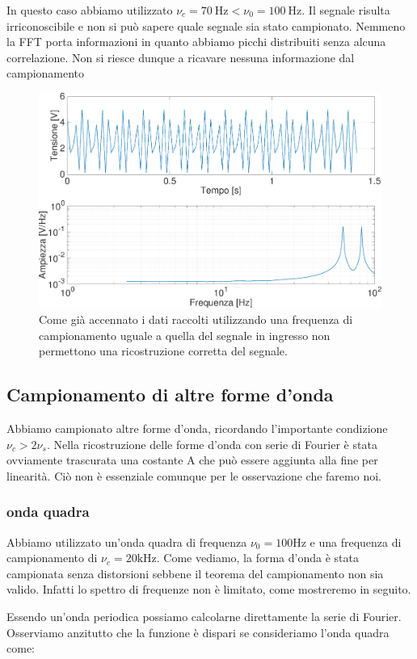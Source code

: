 In questo caso abbiamo utilizzato $\nu_c=\SI{70}{\Hz} < \nu_0 =\SI{100}{\Hz}$. Il segnale risulta irriconoscibile e non si può sapere quale segnale sia stato campionato. Nemmeno la FFT porta informazioni in quanto abbiamo picchi distribuiti senza alcuna correlazione. Non si riesce dunque a ricavare nessuna informazione dal campionamento

\begin{figure}[H]
\centering
	\includegraphics[width=.65\textwidth]{../E13/latex/sin100hz@100,70_crop.pdf}
	\caption{Come già accennato i dati raccolti utilizzando una frequenza di campionamento uguale a quella del segnale in ingresso non permettono una ricostruzione corretta del segnale. }
	\label{sin2}
\end{figure}

\subsection{Campionamento di altre forme d'onda}
Abbiamo campionato altre forme d'onda, ricordando l'importante condizione $\nu_c>2\nu_s$. Nella ricostruzione delle forme d'onda con serie di Fourier è stata ovviamente trascurata una costante A che può essere aggiunta alla fine per linearità. Ciò non è essenziale comunque per le osservazione che faremo noi.


\subsubsection{onda quadra}
Abbiamo utilizzato un'onda quadra di frequenza $\nu_0=100 \si{\hertz}$ e una frequenza di campionamento di $\nu_c=20\si{\kilo\hertz}$. Come vediamo, la forma d'onda è stata campionata senza distorsioni sebbene il teorema del campionamento non sia valido. Infatti lo spettro di frequenze non è limitato, come mostreremo in seguito.

Essendo un'onda periodica possiamo calcolarne direttamente la serie di Fourier. Osserviamo anzitutto che la funzione è dispari se consideriamo l'onda quadra come: 


